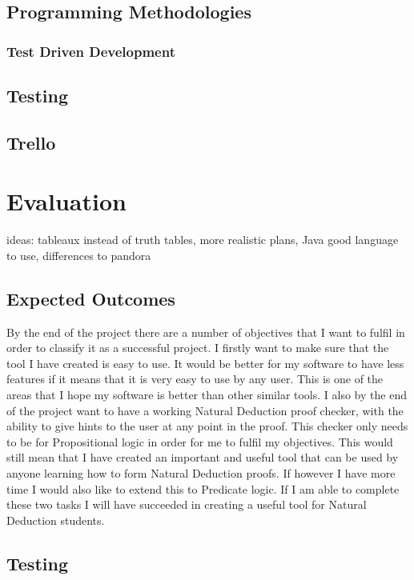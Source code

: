 \subsection{Programming Methodologies}
\subsubsection{Test Driven Development} \label{TDD}

\subsection{Testing}

\subsection{Trello}

\section{Evaluation}

ideas: tableaux instead of truth tables, more realistic plans, Java good language to use, differences to pandora
\subsection{Expected Outcomes}

By the end of the project there are a number of objectives that I want to fulfil in order to classify it as a successful project. I firstly want to make sure that the tool I have created is easy to use. It would be better for my software to have less features if it means that it is very easy to use by any user. This is one of the areas that I hope my software is better than other similar tools. I also by the end of the project want to have a working Natural Deduction proof checker, with the ability to give hints to the user at any point in the proof. This checker only needs to be for Propositional logic in order for me to fulfil my objectives. This would still mean that I have created an important and useful tool that can be used by anyone learning how to form Natural Deduction proofs. If however I have more time I would also like to extend this to Predicate logic. If I am able to complete these two tasks I will have succeeded in creating a useful tool for Natural Deduction students.

\subsection{Testing}

